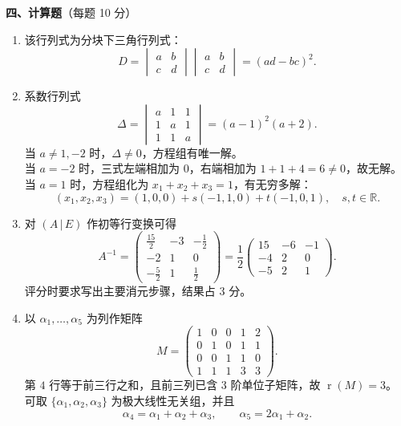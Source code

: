 \documentclass[12pt]{ctexart}
\newcommand{\rnk}{\operatorname{r}}
\begin{document}
\vspace{6pt}
\noindent\textbf{四、计算题}（每题 10 分）
\begin{enumerate}[label=\textbf{\arabic*.},itemsep=11pt]
\item 该行列式为分块下三角行列式：
  \[
  D=\begin{vmatrix}a&b\\c&d\end{vmatrix}
    \begin{vmatrix}a&b\\c&d\end{vmatrix}
  =(ad-bc)^2.
  \]

\item 系数行列式
  \[
  \Delta=\begin{vmatrix}a&1&1\\1&a&1\\1&1&a\end{vmatrix}
  =(a-1)^2(a+2).
  \]
  当 $a\neq1,-2$ 时，$\Delta\neq0$，方程组有唯一解。\\
  当 $a=-2$ 时，三式左端相加为 $0$，右端相加为 $1+1+4=6\neq0$，故无解。\\
  当 $a=1$ 时，方程组化为 $x_1+x_2+x_3=1$，有无穷多解：
  \[
  (x_1,x_2,x_3)=(1,0,0)+s(-1,1,0)+t(-1,0,1),\quad s,t\in\mathbb{R}.
  \]

\item 对 $(A\,|\,E)$ 作初等行变换可得
  \[
  A^{-1}=
  \begin{pmatrix}
  \frac{15}{2}&-3&-\frac12\\
  -2&1&0\\
  -\frac52&1&\frac12
  \end{pmatrix}
  =\frac12\begin{pmatrix}
  15&-6&-1\\
  -4&2&0\\
  -5&2&1
  \end{pmatrix}.
  \]
  评分时要求写出主要消元步骤，结果占 $3$ 分。

\item 以 $\alpha_1,\dots,\alpha_5$ 为列作矩阵
  \[
  M=\begin{pmatrix}
  1&0&0&1&2\\
  0&1&0&1&1\\
  0&0&1&1&0\\
  1&1&1&3&3
  \end{pmatrix}.
  \]
  第 $4$ 行等于前三行之和，且前三列已含 $3$ 阶单位子矩阵，故 $\rnk(M)=3$。
  可取 $\{\alpha_1,\alpha_2,\alpha_3\}$ 为极大线性无关组，并且
  \[
  \alpha_4=\alpha_1+\alpha_2+\alpha_3,\qquad
  \alpha_5=2\alpha_1+\alpha_2.
  \]
\end{enumerate}
\end{document}
